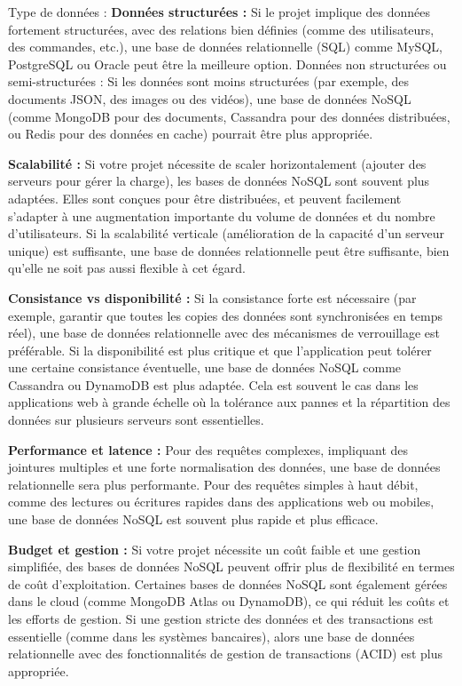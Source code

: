 \documentclass{article}
\begin{document}
    Type de données :
     \textbf{Données structurées :}
     Si le projet implique des données fortement structurées, avec des relations bien définies (comme des utilisateurs, des commandes, etc.), une base de données relationnelle (SQL) comme MySQL, PostgreSQL ou Oracle peut être la meilleure option.
        Données non structurées ou semi-structurées : Si les données sont moins structurées (par exemple, des documents JSON, des images ou des vidéos), une base de données NoSQL (comme MongoDB pour des documents, Cassandra pour des données distribuées, ou Redis pour des données en cache) pourrait être plus appropriée.

    \textbf{Scalabilité :}
        Si votre projet nécessite de scaler horizontalement (ajouter des serveurs pour gérer la charge), les bases de données NoSQL sont souvent plus adaptées. Elles sont conçues pour être distribuées, et peuvent facilement s'adapter à une augmentation importante du volume de données et du nombre d’utilisateurs.
        Si la scalabilité verticale (amélioration de la capacité d’un serveur unique) est suffisante, une base de données relationnelle peut être suffisante, bien qu’elle ne soit pas aussi flexible à cet égard.

    \textbf{Consistance vs disponibilité :}
        Si la consistance forte est nécessaire (par exemple, garantir que toutes les copies des données sont synchronisées en temps réel), une base de données relationnelle avec des mécanismes de verrouillage est préférable.
        Si la disponibilité est plus critique et que l'application peut tolérer une certaine consistance éventuelle, une base de données NoSQL comme Cassandra ou DynamoDB est plus adaptée. Cela est souvent le cas dans les applications web à grande échelle où la tolérance aux pannes et la répartition des données sur plusieurs serveurs sont essentielles.

    \textbf{Performance et latence :}
        Pour des requêtes complexes, impliquant des jointures multiples et une forte normalisation des données, une base de données relationnelle sera plus performante.
        Pour des requêtes simples à haut débit, comme des lectures ou écritures rapides dans des applications web ou mobiles, une base de données NoSQL est souvent plus rapide et plus efficace.

    \textbf{Budget et gestion :}
        Si votre projet nécessite un coût faible et une gestion simplifiée, des bases de données NoSQL peuvent offrir plus de flexibilité en termes de coût d’exploitation. Certaines bases de données NoSQL sont également gérées dans le cloud (comme MongoDB Atlas ou DynamoDB), ce qui réduit les coûts et les efforts de gestion.
        Si une gestion stricte des données et des transactions est essentielle (comme dans les systèmes bancaires), alors une base de données relationnelle avec des fonctionnalités de gestion de transactions (ACID) est plus appropriée.
\end{document}
